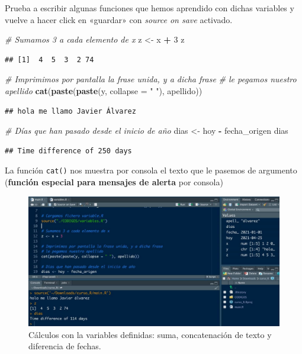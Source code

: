 \documentclass[11pt,]{book}
\newenvironment{Shaded}{\begin{snugshade}}{\end{snugshade}}
\newcommand{\CommentTok}[1]{\textcolor[rgb]{0.37,0.37,0.37}{\textit{#1}}}
\newcommand{\DataTypeTok}[1]{\textcolor[rgb]{0.27,0.27,0.27}{#1}}
\newcommand{\DecValTok}[1]{\textcolor[rgb]{0.06,0.06,0.06}{#1}}
\newcommand{\KeywordTok}[1]{\textcolor[rgb]{0.27,0.27,0.27}{\textbf{#1}}}
\newcommand{\NormalTok}[1]{#1}
\newcommand{\OperatorTok}[1]{\textcolor[rgb]{0.43,0.43,0.43}{\textbf{#1}}}
\newcommand{\StringTok}[1]{\textcolor[rgb]{0.5,0.5,0.5}{#1}}
\begin{document}
Prueba a escribir algunas funciones que hemos aprendido con dichas variables y vuelve a hacer click en «guardar» con \emph{source on save} activado.

\begin{Shaded}
\begin{Highlighting}[]
\CommentTok{# Sumamos 3 a cada elemento de x}
\NormalTok{z <-}\StringTok{ }\NormalTok{x }\OperatorTok{+}\StringTok{ }\DecValTok{3}
\NormalTok{z}
\end{Highlighting}
\end{Shaded}

\begin{verbatim}
## [1]  4  5  3  2 74
\end{verbatim}

\begin{Shaded}
\begin{Highlighting}[]
\CommentTok{# Imprimimos por pantalla la frase unida, y a dicha frase}
\CommentTok{# le pegamos nuestro apellido}
\KeywordTok{cat}\NormalTok{(}\KeywordTok{paste}\NormalTok{(}\KeywordTok{paste}\NormalTok{(y, }\DataTypeTok{collapse =} \StringTok{" "}\NormalTok{), apellido))}
\end{Highlighting}
\end{Shaded}

\begin{verbatim}
## hola me llamo Javier Álvarez
\end{verbatim}

\begin{Shaded}
\begin{Highlighting}[]
\CommentTok{# Días que han pasado desde el inicio de año}
\NormalTok{dias <-}\StringTok{ }\NormalTok{hoy }\OperatorTok{-}\StringTok{ }\NormalTok{fecha_origen}
\NormalTok{dias}
\end{Highlighting}
\end{Shaded}

\begin{verbatim}
## Time difference of 250 days
\end{verbatim}

La función \texttt{cat()} nos muestra por consola el texto que le pasemos de argumento (\textbf{función especial para mensajes de alerta} por consola)

\begin{figure}

{\centering \includegraphics[width=0.5\linewidth]{./img/codigo_1} 

}

\caption{Cálculos con la variables definidas: suma, concatenación de texto y diferencia de fechas.}\label{fig:codigo-1}
\end{figure}
\end{document}
